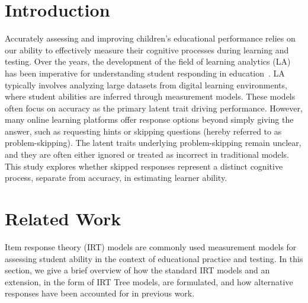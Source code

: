\documentclass[manuscript]{acmart}
\begin{document}

\maketitle



\section{Introduction}
Accurately assessing and improving children's educational performance relies on our ability to effectively measure their cognitive processes during learning and testing. Over the years, the development of the field of learning analytics (LA) has been imperative for understanding student responding in education~\cite{ye2022history}. LA typically involves analyzing large datasets from digital learning environments, where student abilities are inferred through measurement models. These models often focus on accuracy as the primary latent trait driving performance. However, many online learning platforms offer response options beyond simply giving the answer, such as requesting hints or skipping questions (hereby referred to as problem-skipping). The latent traits underlying problem-skipping remain unclear, and they are often either ignored or treated as incorrect in traditional models. This study explores whether skipped responses represent a distinct cognitive process, separate from accuracy, in estimating learner ability.

\section{Related Work}
Item response theory (IRT) models are commonly used measurement models for assessing student ability in the context of educational practice and testing. In this section, we give a brief overview of how the standard IRT models and an extension, in the form of IRT Tree models,  are formulated, and how alternative responses have been accounted for in previous work. 
\end{document}
